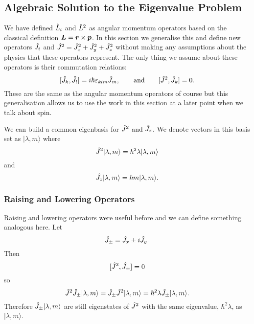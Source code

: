 \documentclass[a4paper]{article}
\renewcommand{\ket}[1]{\vert {#1} \rangle}
\theoremstyle{definition}
\begin{document}
    \subsection{Algebraic Solution to the Eigenvalue Problem}\label{sec:algebraic solution to the eigenvalue problem}
    We have defined \(\hat{L}_i\) and \(\hat{L}^2\) as angular momentum operators based on the classical definition \(\bm{L} = \bm{r}\times\bm{p}\).
    In this section we generalise this and define new operators \(\hat{J}_i\) and \(\hat{J}^2 = \hat{J}_x^2 + \hat{J}_y^2 + \hat{J}_z^2\) without making any assumptions about the physics that these operators represent.
    The only thing we assume about these operators is their commutation relations:
    \[[\hat{J}_k, \hat{J}_l] = i\hbar\varepsilon_{klm}\hat{J}_m, \qquad\text{and}\qquad [\hat{J}^2, \hat{J}_k] = 0.\]
    These are the same as the angular momentum operators of course but this generalisation allows us to use the work in this section at a later point when we talk about spin.
    
    We can build a common eigenbasis for \(\hat{J}^2\) and \(\hat{J}_z\).
    We denote vectors in this basis set as \(\ket{\lambda, m}\) where
    \[\operator{J}^2\ket{\lambda, m} = \hbar^2\lambda\ket{\lambda, m}\]
    and
    \[\operator{J}_z\ket{\lambda, m} = \hbar m\ket{\lambda, m}.\]
    
    \subsubsection{Raising and Lowering Operators}
    Raising and lowering operators were useful before and we can define something analogous here.
    Let
    \[\hat{J}_{\pm} = \hat{J}_x \pm i\hat{J}_y.\]
    Then
    \[[\hat{J}^2, \hat{J}_{\pm}] = 0\]
    so
    \[\operator{J}^2\operator{J}_{\pm}\ket{\lambda, m} = \operator{J}_{\pm}\operator{J}^2\ket{\lambda, m} = \hbar^2\lambda\operator{J}_{\pm}\ket{\lambda, m}.\]
    Therefore \(\operator{J}_{\pm}\ket{\lambda, m}\) are still eigenstates of \(\hat{J}^2\) with the same eigenvalue, \(\hbar^2\lambda\), as \(\ket{\lambda, m}\).
    
\end{document}
